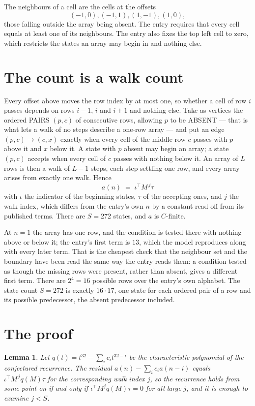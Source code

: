 \documentclass[11pt,a4paper]{article}
\theoremstyle{plain}
\newtheorem{lemma}[theorem]{Lemma}
\theoremstyle{definition}
\begin{document}
The neighbours of a cell are the cells at the offsets
\[
(-1,0), (-1,1), (1,-1), (1,0),
\]
those falling outside the array being absent. The entry requires that every cell equals at least one of its neighbours. The entry also fixes the top left cell to zero, which restricts the states an array may begin in and nothing else.

\section{The count is a walk count}

Every offset above moves the row index by at most one, so whether a cell of row $i$ passes
depends on rows $i-1$, $i$ and $i+1$ and nothing else. Take as vertices the ordered PAIRS
$(p,c)$ of consecutive rows, allowing $p$ to be ABSENT --- that is what lets a walk of no steps
describe a one-row array --- and put an edge $(p,c)\to(c,x)$ exactly when every cell of the
middle row $c$ passes with $p$ above it and $x$ below it. A state with $p$ absent may begin an
array; a state $(p,c)$ accepts when every cell of $c$ passes with nothing below it. An array of
$L$ rows is then a walk of $L-1$ steps, each step settling one row, and every array arises from
exactly one walk. Hence
\[
a(n)\;=\;\iota^{\!\top}M^{\,j}\tau
\]
with $\iota$ the indicator of the beginning states, $\tau$ of the accepting ones, and $j$ the
walk index, which differs from the entry's own $n$ by a constant read off from its published
terms. There are $S=272$ states, and $a$ is $C$-finite.

At $n=1$ the array has one row, and
the condition is tested there with nothing above or below it; the entry's first term is
$13$, which the model reproduces along with every later term. That is the cheapest check
that the neighbour set and the boundary have been read the same way the entry reads them: a
condition tested as though the missing rows were present, rather than absent, gives a different
first term. There are $2^{4}=16$ possible rows over the entry's own alphabet. The state count $S=272$ is exactly $16\cdot17$,
one state for each ordered pair of a row and its possible predecessor, the absent predecessor
included.

\section{The proof}

\begin{lemma}\label{lem:crit}
Let $q(t)=t^{32}-\sum_i c_it^{32-i}$ be the characteristic polynomial of the
conjectured recurrence. The residual $a(n)-\sum_ic_ia(n-i)$ equals
$\iota^{\!\top}M^{\,j}q(M)\tau$ for the corresponding walk index $j$, so the recurrence
holds from some point on if and only if $\iota^{\!\top}M^{j}q(M)\tau=0$ for all large $j$,
and it is enough to examine $j<S$.
\end{lemma}
\end{document}
